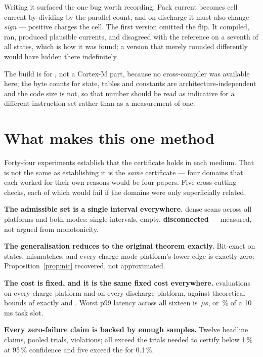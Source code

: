 \documentclass[11pt,letterpaper]{article}
\theoremstyle{definition}
\theoremstyle{remark}
\begin{document}
Writing it surfaced the one bug worth recording. Pack current becomes cell current by dividing by
the parallel count, and on discharge it must also change \emph{sign} --- positive charges the
cell. The first version omitted the flip. It compiled, ran, produced plausible currents, and
disagreed with the reference on a seventh of all states, which is how it was found; a version
that merely rounded differently would have hidden there indefinitely.

The build is for \texttt{\fwTarget}, not a Cortex-M part, because no cross-compiler was
available here; the byte counts for state, tables and constants are architecture-independent and
the code size is not, so that number should be read as indicative for a different instruction
set rather than as a measurement of one.



\section{What makes this one method}\label{sec:cross}

Forty-four experiments establish that the certificate holds in each medium. That is not the same
as establishing it is the \emph{same} certificate --- four domains that each worked for their
own reasons would be four papers. Five cross-cutting checks, each of which would fail if the
domains were only superficially related.

\textbf{The admissible set is a single interval everywhere.} \scanTotal{} dense scans across all
\vPlatforms{} platforms and both modes: \scanSingle{} single intervals, \scanEmpty{} empty,
\textbf{\scanDisconnected{} disconnected} --- measured, not argued from monotonicity.

\textbf{The generalisation reduces to the original theorem exactly.} Bit-exact on
\reduceStates{} states, \reduceMismatch{} mismatches, and every charge-mode platform's lower
edge is exactly zero: Proposition~\ref{prop:nic} recovered, not approximated.

\textbf{The cost is fixed, and it is the same fixed cost everywhere.} \evalCharge{} evaluations
on every charge platform and \evalDischarge{} on every discharge platform, against theoretical
bounds of exactly \evalCharge{} and \evalDischarge{}. Worst p99 latency across all sixteen is
\worstLatency\,$\mu$s, or \slotFraction\,\% of a 10\,ms task slot.

\textbf{Every zero-failure claim is backed by enough samples.} Twelve headline claims,
\adequacyTrials{} pooled trials, \adequacyViol{} violations; all exceed the \nReqOne{} trials
needed to certify below 1\,\% at 95\,\% confidence and five exceed the \nReqTenth{} for
0.1\,\%.
\end{document}
